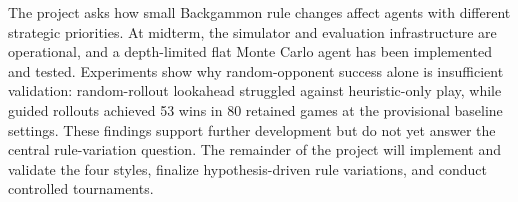 The project asks how small Backgammon rule changes affect agents with different strategic priorities. At midterm, the simulator and evaluation infrastructure are operational, and a depth-limited flat Monte Carlo agent has been implemented and tested. Experiments show why random-opponent success alone is insufficient validation: random-rollout lookahead struggled against heuristic-only play, while guided rollouts achieved 53 wins in 80 retained games at the provisional baseline settings. These findings support further development but do not yet answer the central rule-variation question. The remainder of the project will implement and validate the four styles, finalize hypothesis-driven rule variations, and conduct controlled tournaments.
